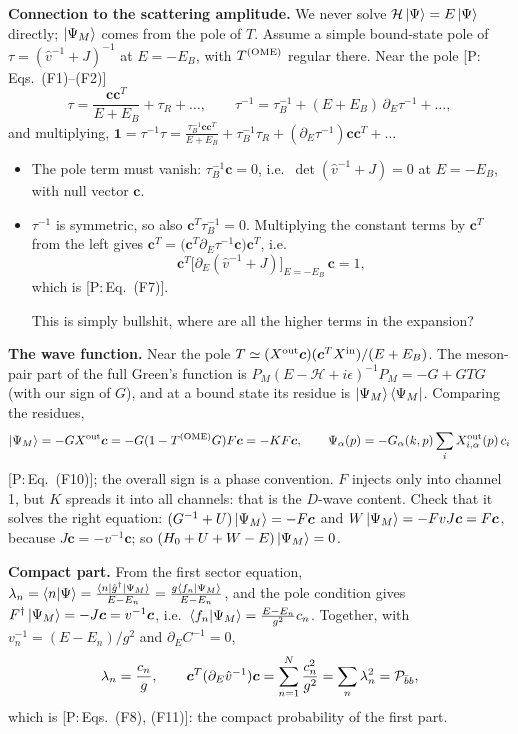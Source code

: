 \documentclass[11pt]{article}
\newcommand{\Pbb}{{\cal P}_{\bar bb}}
\newcommand{\tagP}[1]{\textcolor{blue!65!black}{\textsf{\small[P:\,#1]}}}
\newenvironment{aiadd}{\par}{\par}
\begin{document}
\begin{aiadd}
	\textbf{Connection to the scattering amplitude.} We never solve $\mathcal H\ket\Psi=E\ket\Psi$ directly; $\ket{\Psi_M}$ comes from the pole of $T$. Assume a simple bound-state pole of $\tau=(\hat v^{-1}+J)^{-1}$ at $E=-E_B$, with $T^{\rm (OME)}$ regular there. Near the pole \tagP{Eqs.~(F1)--(F2)}
	\[
		\tau=\frac{\bm c\bm c^T}{E+E_B}+\tau_R+\dots,\qquad
		\tau^{-1}=\tau_B^{-1}+(E+E_B)\,\partial_E\tau^{-1}+\dots,
	\]
	and multiplying, $\bm 1=\tau^{-1}\tau=\frac{\tau_B^{-1}\bm c\bm c^T}{E+E_B}+\tau_B^{-1}\tau_R+(\partial_E\tau^{-1})\bm c\bm c^T+\dots$
	\begin{itemize}
		\item The pole term must vanish: $\tau_B^{-1}\bm c=0$, i.e.\ $\det(\hat v^{-1}+J)=0$ at $E=-E_B$, with null vector $\bm c$.
		\item $\tau^{-1}$ is symmetric, so also $\bm c^T\tau_B^{-1}=0$. Multiplying the constant terms by $\bm c^T$ from the left gives $\bm c^T=\big(\bm c^T\partial_E\tau^{-1}\bm c\big)\bm c^T$, i.e.
		      \[
			      \bm c^T\big[\partial_E(\hat v^{-1}+J)\big]_{E=-E_B}\,\bm c=1,
		      \]
		      which is \tagP{Eq.~(F7)}.

		      This is simply bullshit, where are all the higher terms in the expansion?
	\end{itemize}

	\textbf{The wave function.} Near the pole $T\simeq(X^{\rm out}\bm c)(\bm c^TX^{\rm in})/(E+E_B)$. The meson-pair part of the full Green's function is $P_M(E-\mathcal H+i\epsilon)^{-1}P_M=-G+GTG$ (with our sign of $G$), and at a bound state its residue is $\ket{\Psi_M}\bra{\Psi_M}$. Comparing the residues,
	\[
		\ket{\Psi_M}=-GX^{\rm out}\bm c=-G(1-T^{\rm (OME)} G)F\bm c=-KF\bm c,\qquad
		\Psi_\alpha(p)=-G_\alpha(k,p)\sum_iX^{\rm out}_{i,\alpha}(p)\,c_i
	\]
	\tagP{Eq.~(F10)}; the overall sign is a phase convention. $F$ injects only into channel 1, but $K$ spreads it into all channels: that is the $D$-wave content. Check that it solves the right equation: $(G^{-1}+U)\ket{\Psi_M}=-F\bm c$ and $W\ket{\Psi_M}=-FvJ\bm c=F\bm c$, because $J\bm c=-v^{-1}\bm c$; so $(H_0+U+W-E)\ket{\Psi_M}=0$.

	\textbf{Compact part.} From the first sector equation, $\lambda_n=\braket{n|\Psi}=\frac{\braket{n|\hat g^\dagger|\Psi_M}}{E-E_n}=\frac{g\braket{f_n|\Psi_M}}{E-E_n}$, and the pole condition gives $F^\dagger\ket{\Psi_M}=-J\bm c=v^{-1}\bm c$, i.e.\ $\braket{f_n|\Psi_M}=\frac{E-E_n}{g^2}c_n$. Together, with $v_n^{-1}=(E-E_n)/g^2$ and $\partial_EC^{-1}=0$,
	\[
		\lambda_n=\frac{c_n}{g},\qquad
		\bm c^T(\partial_E\hat v^{-1})\bm c=\sum_{n=1}^N\frac{c_n^2}{g^2}=\sum_n\lambda_n^2=\Pbb,
	\]
	which is \tagP{Eqs.~(F8), (F11)}: the compact probability of the first part.


\end{aiadd}
\end{document}

